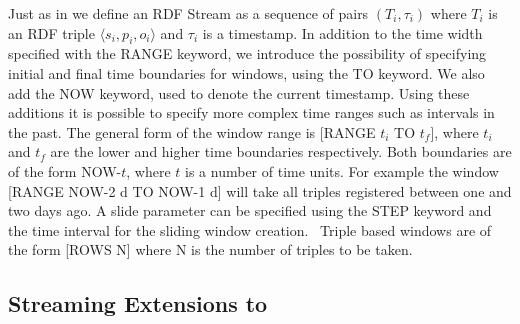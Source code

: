 Just as in \cite{Barbieri_2010} we define an RDF Stream as a sequence of pairs $(T_i,\tau_i)$ where $T_i$ is an RDF
triple $\langle s_i,p_i,o_i \rangle$ and $\tau_i$ is a timestamp.
In addition to the time width specified with the \textsf{RANGE} keyword, we introduce the possibility of specifying initial and final time boundaries for windows, using the \textsf{TO} keyword. We also add the \textsf{NOW} keyword, used to denote the current timestamp. Using these additions it is possible to specify more complex time ranges such as intervals in the past. The general form of the window range is \textsf{[RANGE $t_i$ TO $t_f$]}, where $t_i$ and $t_f$ are the lower and higher time boundaries respectively. Both boundaries are of the form \textsf{NOW-}$t$, where $t$ is a number of time units. For example the window \textsf{[RANGE NOW-2 d TO NOW-1 d]} will take all triples registered between one and two days ago. %
A slide parameter can be specified using the \textsf{STEP} keyword and the time interval for the sliding window creation.\ %
Triple based windows are of the form \textsf{[ROWS N]} where \textsf{N} is the number of triples to be taken.





\subsection{Streaming Extensions to \rtwoo}
\label{streamingr2osyntax}


